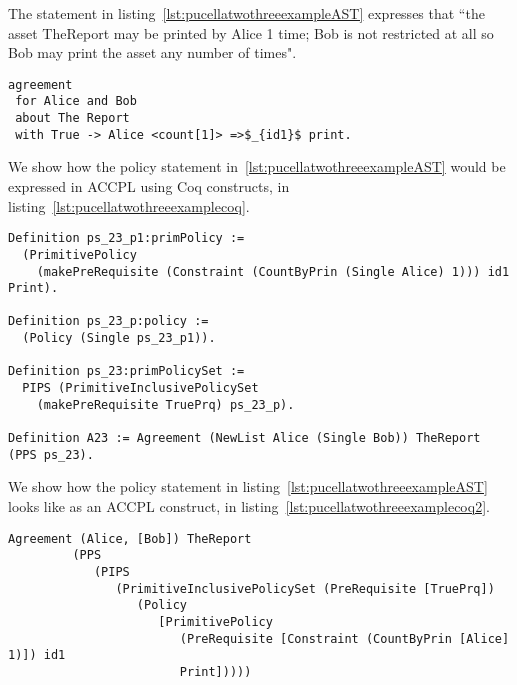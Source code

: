 %

The statement in listing~\ref{lst:pucellatwothreeexampleAST}  expresses that ``the asset TheReport may be printed by Alice 1 time; Bob is not restricted at all so Bob may print the asset any number of times".

\lstset{language=Pucella2006}
\begin{minipage}[c]{0.95\textwidth}
\begin{lstlisting}[frame=single, caption={Agreement of Example 2.3}, label={lst:pucellatwothreeexampleAST}, mathescape]
agreement
 for Alice and Bob 
 about The Report 
 with True -> Alice <count[1]> =>$_{id1}$ print.
\end{lstlisting}
\end{minipage} 

We show how the policy statement in~\ref{lst:pucellatwothreeexampleAST} would be expressed in \ac{ACCPL} using Coq constructs, in listing~\ref{lst:pucellatwothreeexamplecoq}.

\begin{minipage}[c]{0.95\textwidth}
\begin{lstlisting}
Definition ps_23_p1:primPolicy := 
  (PrimitivePolicy 
    (makePreRequisite (Constraint (CountByPrin (Single Alice) 1))) id1 Print).

Definition ps_23_p:policy := 
  (Policy (Single ps_23_p1)).

Definition ps_23:primPolicySet :=
  PIPS (PrimitiveInclusivePolicySet
    (makePreRequisite TruePrq) ps_23_p).

Definition A23 := Agreement (NewList Alice (Single Bob)) TheReport (PPS ps_23).
\end{lstlisting}
\end{minipage} 

We show how the policy statement in listing~\ref{lst:pucellatwothreeexampleAST} looks like as an \ac{ACCPL} construct, in listing~\ref{lst:pucellatwothreeexamplecoq2}.

\begin{minipage}[c]{0.95\textwidth}
\begin{lstlisting}
Agreement (Alice, [Bob]) TheReport
         (PPS
            (PIPS
               (PrimitiveInclusivePolicySet (PreRequisite [TruePrq])
                  (Policy
                     [PrimitivePolicy
                        (PreRequisite [Constraint (CountByPrin [Alice] 1)]) id1
                        Print]))))
\end{lstlisting}
\end{minipage} 

